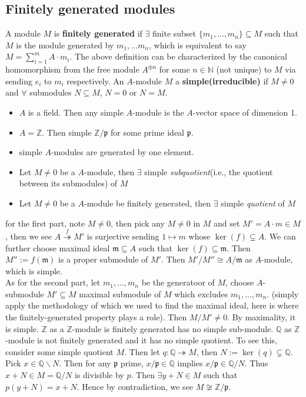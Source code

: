\documentclass[12pt]{article}
\theoremstyle{definition}
\theoremstyle{plain}
\newcommand{\nat}{\mathbb{N}}
\newcommand{\rat}{\mathbb{Q}}
\newcommand{\z}{\mathbb{Z}}
\newcommand{\surj}{\twoheadrightarrow}
\begin{document}
 \subsection{Finitely generated modules}
 \Def A module $M$ is \textbf{finitely generated} if $\exists$ finite subset $\{m_1, ..., m_n\}\subseteq M$ such that $M$ is the module generated by $m_1, ...m_n$, which is equivalent to say $M=\sum_{i=1}^mA\cdot m_i$.
 \Rmk The above definition can be characterized by the canonical homomorphism from the free module $A^{\oplus n}$ for some $n\in \nat$ (not unique) to $M$ via sending $e_i$ to $m_i$ respectively.
 \Def An $A$-module $M$ a \textbf{simple(irreducible)} if $M\neq 0$ and $\forall$ submodules $N\subseteq M$, $N=0$ or $N=M$.
 \Exe \leavevmode
 \begin{itemize}
   \item $A$ is a field. Then any simple $A$-module is the $A$-vector space of dimension 1.
   \item $A=\z$. Then simple $\z/\mathfrak{p}$ for some prime ideal $\mathfrak{p}$.
   \item simple $A$-modules are generated by one element.
 \end{itemize}
 \Prop \leavevmode
 \begin{itemize}
   \item Let $M\neq 0$ be a $A$-module, then $\exists$ simple \textit{subquotient}(i.e., the quotient between its submodules) of $M$
   \item Let $M\neq 0$ be a $A$-module be finitely generated, then $\exists$ simple \textit{quotient} of $M$
 \end{itemize}
 \proof for the first part, note $M\neq 0$, then pick any $M\neq 0$ in $M$ and set $M'=A\cdot m\in M$, then we see $A\overset{f}{\twoheadrightarrow} M'$ is surjective sending $1\mapsto m$ whose $\ker(f)\subsetneq A$. We can further choose maximal ideal $\mathfrak{m}\subseteq A$ such that $\ker(f)\subseteq \mathfrak{m}$. Then $M'':=f(\mathfrak{m})$ is a proper submodule of $M'$. Then $M'/M''\cong A/\mathfrak{m}$ as $A$-module, which is simple.\\ As for the second part, let $m_1, ..., m_n$ be the generatoor of $M$, choose $A$-submodule $M'\subseteq M$ maximal submodule of $M$ which excludes $m_1, ..., m_n$. (simply apply the methodology of which we used to find the maximal ideal, here is where the finitely-generated property plays a role). Then $M/M'\neq 0$. By maximality, it is simple.
 \Exe $\z$ as a $\z$-module is finitely generated has no simple sub-module.
 \Exe $\rat$ as $\z$-module is not finitely generated and it has no simple quotient. To see this, consider some simple quotient $M$. Then let $q: \rat \surj M$, then $N:=\ker(q)\subsetneq \rat$. Pick $x\in \rat\backslash N$. Then for any $\mathfrak{p}$ prime, $x/\mathfrak{p}\in \rat$ implies $x/\mathfrak{p}\in \rat/N$. Thus $x+N\in M=\rat/N$ is divisible by $p$. Then $\exists y+N\in M$ such that $p(y+N)=x+N$. Hence by contradiction, we see $M\not\cong \z/\mathfrak{p}$.
\end{document}
